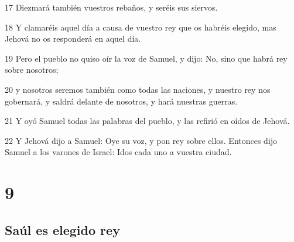 \par 17 Diezmará también vuestros rebaños, y seréis sus siervos.
\par 18 Y clamaréis aquel día a causa de vuestro rey que os habréis elegido, mas Jehová no os responderá en aquel día.
\par 19 Pero el pueblo no quiso oír la voz de Samuel, y dijo: No, sino que habrá rey sobre nosotros;
\par 20 y nosotros seremos también como todas las naciones, y nuestro rey nos gobernará, y saldrá delante de nosotros, y hará nuestras guerras.
\par 21 Y oyó Samuel todas las palabras del pueblo, y las refirió en oídos de Jehová.
\par 22 Y Jehová dijo a Samuel: Oye su voz, y pon rey sobre ellos. Entonces dijo Samuel a los varones de Israel: Idos cada uno a vuestra ciudad.

\chapter{9}

\section*{Saúl es elegido rey}

